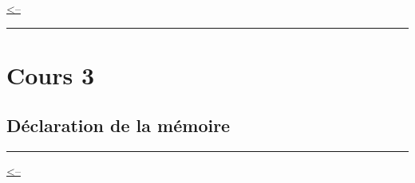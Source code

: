 \href{../README.md}{\textless--}

\begin{center}\rule{0.5\linewidth}{0.5pt}\end{center}

\section{Cours 3}\label{cours-3}

\subsection{Déclaration de la
mémoire}\label{duxe9claration-de-la-muxe9moire}

\begin{center}\rule{0.5\linewidth}{0.5pt}\end{center}

\href{../README.md}{\textless--}
